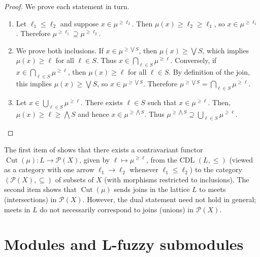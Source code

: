 \documentclass[a4paper,10pt]{article}
\newcommand{\calp}{\mathcal{P}}
\DeclareMathOperator{\cut}{Cut}
\begin{document}
\begin{proof}
We prove each statement in turn.
\begin{enumerate}
\item Let \(\ell_1 \leq \ell_2\) and suppose \(x \in \mu^{\geq \ell_2}\). Then \(\mu(x) \geq \ell_2 \geq \ell_1\), so \(x \in \mu^{\geq \ell_1}\). Therefore \(\mu^{\geq \ell_1} \supseteq \mu^{\geq \ell_2}\).
\item We prove both inclusions. If \(x \in \mu^{\geq \bigvee S}\), then \(\mu(x)\geq \bigvee S\), which implies \(\mu(x) \geq \ell\) for all \(\ell \in S\). Thus \(x \in \bigcap_{\ell \in S}\mu^{\geq \ell}\). Conversely, if \(x \in \bigcap_{\ell \in S}\mu^{\geq \ell}\), then \(\mu(x) \geq \ell\) for all \(\ell \in S\). By definition of the join, this implies \(\mu(x) \geq \bigvee S\), so \(x \in \mu^{\geq \bigvee S}\). Therefore \(\mu^{\geq \bigvee S} = \bigcap_{\ell \in S}\mu^{\geq \ell}\).
\item Let \(x \in \bigcup_{\ell \in S}\mu^{\geq \ell}\). There exists \(\ell \in S\) such that \(x \in \mu^{\geq \ell}\). Then, \(\mu(x) \geq \ell\geq \bigwedge S\) and hence \(x \in \mu^{\geq \bigwedge S}\). Thus \(\mu^{\geq \bigwedge S} \supseteq \bigcup_{\ell \in S}\mu^{\geq \ell}\). \qedhere
\end{enumerate}
\end{proof}

The first item of  shows that there exists a contravariant functor \(\cut(\mu) : L \to \calp(X)\), given by \(\ell \mapsto \mu^{\ge \ell}\), from the CDL \((L,\le)\) (viewed as a category with one arrow \(\ell_1 \to \ell_2\) whenever \(\ell_1 \le \ell_2\)) to the category \((\mathcal{P}(X),\subseteq)\) of subsets of \(X\) (with morphisms restricted to inclusions). 
The second item shows that \(\cut(\mu)\) sends joins in the lattice \(L\) to meets (intersections) in \(\mathcal{P}(X)\). However, the dual statement need not hold in general; meets in \(L\) do not necessarily correspond to joins (unions) in \(\mathcal{P}(X)\).

\section{Modules and L-fuzzy submodules}
\label{sec:lfuzzysubmodules}
\end{document}
